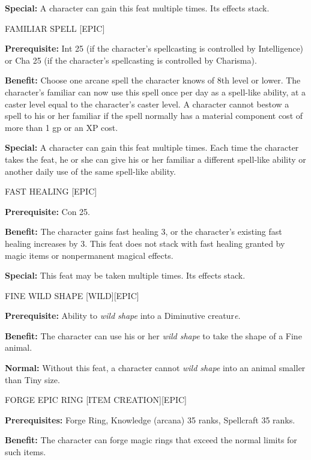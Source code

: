 \documentclass{article}
\begin{document}
\textbf{Special:} A character can gain this feat multiple times. Its effects stack. 

\vspace{12pt}
FAMILIAR SPELL [EPIC] 

\textbf{Prerequisite:} Int 25 (if the character's spellcasting is controlled by 
Intelligence) or Cha 25 (if the character's spellcasting is controlled by Charisma). 

\textbf{Benefit:} Choose one arcane spell the character knows of 8th level or lower. 
The character's familiar can now use this spell once per day as a spell-like ability, 
at a caster level equal to the character's caster level. A character cannot bestow 
a spell to his or her familiar if the spell normally has a material component cost 
of more than 1 gp or an XP cost. 

\textbf{Special:} A character can gain this feat multiple times. Each time the 
character takes the feat, he or she can give his or her familiar a different spell-like 
ability or another daily use of the same spell-like ability. 

\vspace{12pt}
FAST HEALING [EPIC] 

\textbf{Prerequisite:} Con 25. 

\textbf{Benefit:} The character gains fast healing 3, or the character's existing 
fast healing increases by 3. This feat does not stack with fast healing granted 
by magic items or nonpermanent magical effects. 

\textbf{Special:} This feat may be taken multiple times. Its effects stack. 

\vspace{12pt}
FINE WILD SHAPE [WILD][EPIC]

\textbf{Prerequisite:} Ability to \textit{wild shape }into a Diminutive creatur\textit{e. 
}

\textbf{Benefit:} The character can use his or her \textit{wild shape }to take 
the shape of a Fine animal. 

\textbf{Normal:} Without this feat, a character cannot \textit{wild shape }into 
an animal smaller than Tiny size. 

\vspace{12pt}
FORGE EPIC RING [ITEM CREATION][EPIC] 

\textbf{Prerequisites:} Forge Ring, Knowledge (arcana) 35 ranks, Spellcraft 35 
ranks. 

\textbf{Benefit:} The character can forge magic rings that exceed the normal limits 
for such items.
\end{document}
